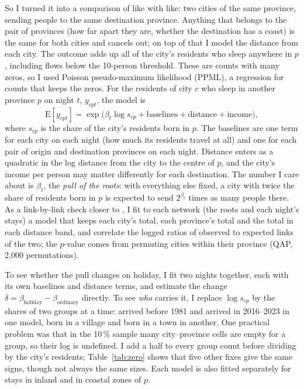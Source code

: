 So I turned it into a comparison of like with like: two cities of the same province, sending people to the same destination province. Anything that belongs to the pair of provinces (how far apart they are, whether the destination has a coast) is the same for both cities and cancels out; on top of that I model the distance from each city. The outcome adds up all of the city's residents who sleep anywhere in $p$, including flows below the 10-person threshold. These are counts with many zeros, so I used Poisson pseudo-maximum likelihood (PPML), a regression for counts that keeps the zeros. For the residents of city $c$ who sleep in another province $p$ on night $t$, $y_{cpt}$, the model is
\begin{equation}
\mathrm{E}[y_{cpt}] = \exp\big(\beta_t \log s_{cp} + \text{baselines} + \text{distance} + \text{income}\big),
\label{eq:ppml}
\end{equation}
where $s_{cp}$ is the share of the city's residents born in $p$. The baselines are one term for each city on each night (how much its residents travel at all) and one for each pair of origin and destination provinces on each night. Distance enters as a quadratic in the log distance from the city to the centre of $p$, and the city's income per person \citep{ine2026adrh} may matter differently for each destination. The number I care about is $\beta_t$, the \emph{pull of the roots}: with everything else fixed, a city with twice the share of residents born in $p$ is expected to send $2^{\beta_t}$ times as many people there. As a link-by-link check closer to \citet{li2016spring}, I fit to each network (the roots and each night's stays) a model that keeps each city's total, each province's total and the total in each distance band, and correlate the logged ratios of observed to expected links of the two; the $p$-value comes from permuting cities within their province (QAP, 2,000 permutations).

To see whether the pull changes on holiday, I fit two nights together, each with its own baselines and distance terms, and estimate the change $\delta=\beta_{\text{holiday}}-\beta_{\text{ordinary}}$ directly. To see \emph{who} carries it, I replace $\log s_{cp}$ by the shares of two groups at a time: arrived before 1981 and arrived in 2016--2023 in one model, born in a village and born in a town in another. One practical problem was that in the 10\,\% sample many city--province cells are empty for a group, so their log is undefined. I add a half to every group count before dividing by the city's residents; Table~\ref{tab:zero} shows that five other fixes give the same signs, though not always the same sizes. Each model is also fitted separately for stays in inland and in coastal zones of $p$.

